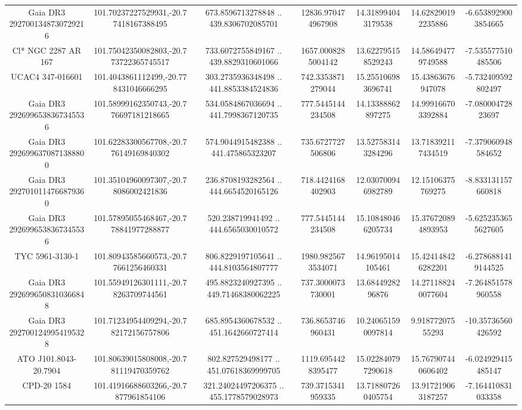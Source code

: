 \begin{table}
\begin{tabular}{ccccccc}
Gaia DR3 2927001348730729216 & 101.70237227529931,-20.77418167388495 & 673.8596713278848 .. 439.8306702085701 & 12836.970474967908 & 14.318994043179538 & 14.628290192235886 & -6.6538929003854665 \\
Cl* NGC 2287     AR     167 & 101.75042350082803,-20.773722365745517 & 733.6072755849167 .. 439.8829310601066 & 1657.0008285004142 & 13.622795158529243 & 14.586494779749588 & -7.535577510485506 \\
UCAC4 347-016601 & 101.4043861112499,-20.778431046666295 & 303.2735936348498 .. 441.8853384524836 & 742.3353871279044 & 15.255106983696741 & 15.43863676947078 & -5.732409592802497 \\
Gaia DR3 2926996538367345536 & 101.58999162350743,-20.776697181218665 & 534.0584867036694 .. 441.7998367120735 & 777.5445144234508 & 14.13388862897275 & 14.999166703392884 & -7.08000472823697 \\
Gaia DR3 2926996370871388800 & 101.62283300567708,-20.776149169840302 & 574.9044915482388 .. 441.475865323207 & 735.6727727506806 & 13.527583143284296 & 13.718392117434519 & -7.379060948584652 \\
Gaia DR3 2927010114766879360 & 101.35104960097307,-20.78086002421836 & 236.8708193282564 .. 444.6654520165126 & 718.4424168402903 & 12.030700946982789 & 12.15106375769275 & -8.833131157660818 \\
Gaia DR3 2926996538367345536 & 101.57895055468467,-20.778841977288877 & 520.238719941492 .. 444.6565030010572 & 777.5445144234508 & 15.108480466205734 & 15.376720894893953 & -5.6252353655627605 \\
TYC 5961-3130-1 & 101.80943585660573,-20.77661256460331 & 806.8229197105641 .. 444.8103564807777 & 1980.9825673534071 & 14.96195014105461 & 15.424148426282201 & -6.2786881419144525 \\
Gaia DR3 2926996508310366848 & 101.55949126301111,-20.78263709744561 & 495.8823240927395 .. 449.71468380062225 & 737.3000073730001 & 13.6844928296876 & 14.271188240077604 & -7.264851578960558 \\
Gaia DR3 2927001249954195328 & 101.71234954409294,-20.782172156757806 & 685.8954360678532 .. 451.1642660727414 & 736.8653746960431 & 10.240651590097814 & 9.91877207555293 & -10.35736560426592 \\
ATO J101.8043-20.7904 & 101.80639015808008,-20.781119470359762 & 802.827529498177 .. 451.07618369999705 & 1119.6954428395477 & 15.022840797290618 & 15.767907440606402 & -6.024929415485147 \\
CPD-20  1584 & 101.41916688603266,-20.7877961854106 & 321.24024497206375 .. 455.1778579028973 & 739.3715341959335 & 13.718807260405754 & 13.917219063187257 & -7.164410831033358 \\

\end{tabular}
\end{table}
